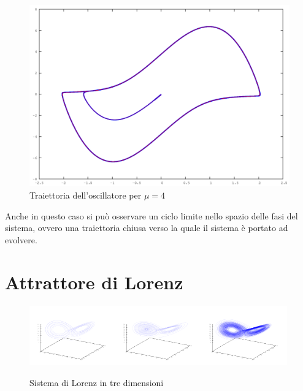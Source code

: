 \begin{figure}[h!]
\centering
\includegraphics[width=\textwidth]{vanderpol}
\caption{Traiettoria dell'oscillatore per $\mu = 4$}
\label{fig:vanderpol}
\end{figure}
Anche in questo caso si può osservare un ciclo limite nello spazio delle fasi del sistema, ovvero una traiettoria chiusa verso la quale il sistema è portato ad evolvere.

\section{Attrattore di Lorenz}
\begin{figure}[h!]
\centering
\includegraphics[width=0.33\textwidth]{lorenz0}\includegraphics[width=0.33\textwidth]{lorenz1}\includegraphics[width=0.33\textwidth]{lorenz2}
\caption{Sistema di Lorenz in tre dimensioni}
\label{fig:lorenz}
\end{figure}

